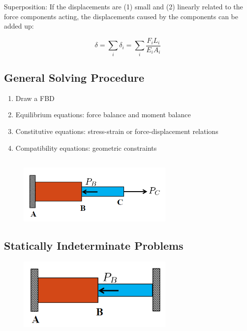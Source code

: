 Superposition: If the displacements are (1) small and (2) linearly related to the force components acting, the displacements caused by the components can be added up:

\[\delta = \sum_i \delta_i = \sum_i \frac{F_i L_i}{E_i A_i}\]

\subsection{General Solving Procedure}

\begin{enumerate}
    \item Draw a FBD
    \item Equilibrium equations: force balance and moment balance
    \item Constitutive equations: stress-strain or force-displacement relations
    \item Compatibility equations: geometric constraints
\end{enumerate}

\subsection{}

\begin{figure}[!h]
\centering
\includegraphics[angle=0, width=3in]{Axial Loading-Figures/StaticallyDeterminate.png}
\vspace{-2mm}
\caption{\small {}}
\vspace{-3mm}
\label{Fig:Determinate}
\end{figure}

\noindent {}

\subsection{Statically Indeterminate Problems}

\begin{figure}[!h]
\centering
\includegraphics[angle=0, width=3in]{Axial Loading-Figures/StaticallyIndeterminate.png}
\vspace{-2mm}
\caption{\small {}}
\vspace{-3mm}
\label{Fig:Indeterminate}
\end{figure}

